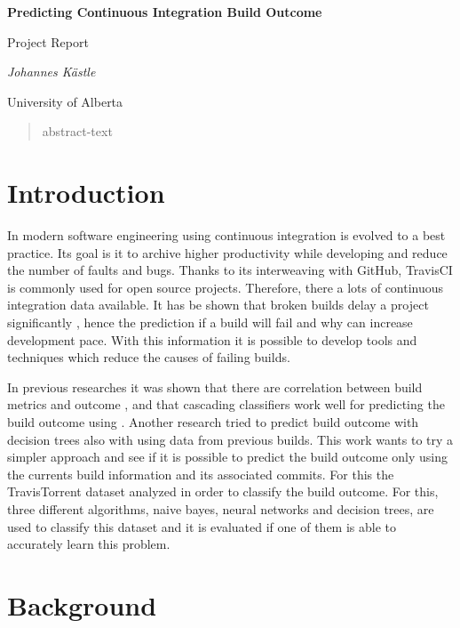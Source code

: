 \documentclass[a4paper,11pt]{article}
\begin{document}
	
	\begin{center}
	{\huge\bfseries Predicting Continuous Integration Build Outcome \par}
	{\Large Project Report\par}
	
	\vspace{1cm}
	{\Large\itshape Johannes Kästle\par}
	{ University of Alberta \par}
	\end{center}


\setlength{\parindent}{0pt}
\setlength{\parskip}{1.5ex plus0.5ex minus0.5ex}

\begin{abstract}
	abstract-text
\end{abstract}

\section{Introduction}

In modern software engineering using continuous integration is evolved to a best practice. Its goal is it to archive higher productivity while developing and reduce the number of faults and bugs. Thanks to its interweaving with GitHub, TravisCI is commonly used for open source projects. Therefore, there a lots of continuous integration data available. It has be shown that broken builds delay a project significantly \cite{CIDelay}, hence the prediction if a build will fail and why can increase development pace. With this information it is possible to develop tools and techniques which reduce the causes of failing builds. 

In previous researches it was shown that there are correlation between build metrics and outcome \cite{bibid}, and that cascading classifiers work well for predicting the build outcome using  \cite{bibid}. Another research tried to predict build outcome with decision trees also with using data from previous builds. This work wants to try a simpler approach and see if it is possible to predict the build outcome only using the currents build information and its associated commits. For this the TravisTorrent \cite{travisTorrent} dataset analyzed in order to classify the build outcome. For this, three different algorithms, naive bayes, neural networks and decision trees, are used to classify this dataset and it is evaluated if one of them is able to accurately learn this problem. 

\section{Background}
\end{document}
